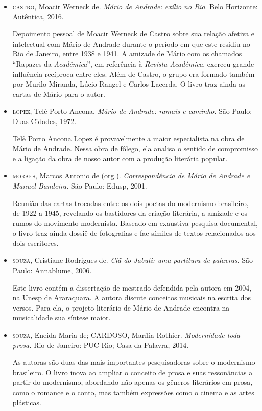 \documentclass[11pt]{extarticle}
\begin{document}
\begin{itemize}
\item \textsc{castro}, Moacir Werneck de. \emph{Mário de Andrade: exílio no Rio}.
Belo Horizonte: Autêntica, 2016.

Depoimento pessoal de Moacir Werneck de Castro sobre sua relação afetiva
e intelectual com Mário de Andrade durante o período em que este residiu
no Rio de Janeiro, entre 1938 e 1941. A amizade de Mário com os chamados
``Rapazes da \emph{Acadêmica}'', em referência à \emph{Revista
Acadêmica}, exerceu grande influência recíproca entre eles. Além de
Castro, o grupo era formado também por Murilo Miranda, Lúcio Rangel e
Carlos Lacerda. O livro traz ainda as cartas de Mário para o autor.

\item \textsc{lopez}, Telê Porto Ancona. \emph{Mário de Andrade: ramais e caminho}.
São Paulo: Duas Cidades, 1972.

Telê Porto Ancona Lopez é provavelmente a maior especialista na obra de
Mário de Andrade. Nessa obra de fôlego, ela analisa o sentido de
compromisso e a ligação da obra de nosso autor com a produção literária
popular.

\item \textsc{moraes}, Marcos Antonio de (org.). \emph{Correspondência de Mário de
Andrade e Manuel Bandeira.} São Paulo: Edusp, 2001.

Reunião das cartas trocadas entre os dois poetas do modernismo
brasileiro, de 1922 a 1945, revelando os bastidores da criação
literária, a amizade e os rumos do movimento modernista. Baseado em
exaustiva pesquisa documental, o livro traz ainda dossiê de fotografias
e fac-símiles de textos relacionados aos dois escritores.

\item \textsc{souza}, Cristiane Rodrigues de. \emph{Clã do Jabuti: uma
partitura de palavras}. São Paulo: Annablume, 2006.

Este livro contém a dissertação de mestrado defendida pela autora em
2004, na Unesp de Araraquara. A autora discute conceitos musicais na
escrita dos versos. Para ela, o projeto literário de Mário de Andrade
encontra na musicalidade sua síntese maior.

\item \textsc{souza}, Eneida Maria de; CARDOSO, Marília Rothier. \emph{Modernidade
toda prosa.} Rio de Janeiro: PUC-Rio; Casa da Palavra, 2014.

As autoras são duas das mais importantes pesquisadoras sobre o
modernismo brasileiro. O livro inova ao ampliar o conceito de prosa e
suas ressonâncias a partir do modernismo, abordando não apenas os
gêneros literários em prosa, como o romance e o conto, mas também
expressões como o cinema e as artes plásticas.


\end{itemize}
\end{document}
